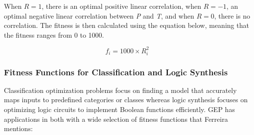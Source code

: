 \begin{enumerate}
    \noindent When $R=1$, there is an optimal positive linear correlation, when $R=-1$, an optimal negative linear correlation between \textit{P} and \textit{T}, and when $R=0$, there is no correlation. The fitness is then calculated using the equation below, meaning that the fitness ranges from 0 to 1000.
    \begin{ceqn}
        \begin{equation}\label{alg:r_square}
            f_i = 1000 \times R_i^2
        \end{equation}
    \end{ceqn}
\end{enumerate}

\subsubsection{Fitness Functions for Classification and Logic Synthesis}
Classification optimization problems focus on finding a model that accurately maps inputs to predefined categories or classes whereas logic synthesis focuses on optimizing logic circuits to implement Boolean functions efficiently. GEP has applications in both with a wide selection of fitness functions that Ferreira mentions:

